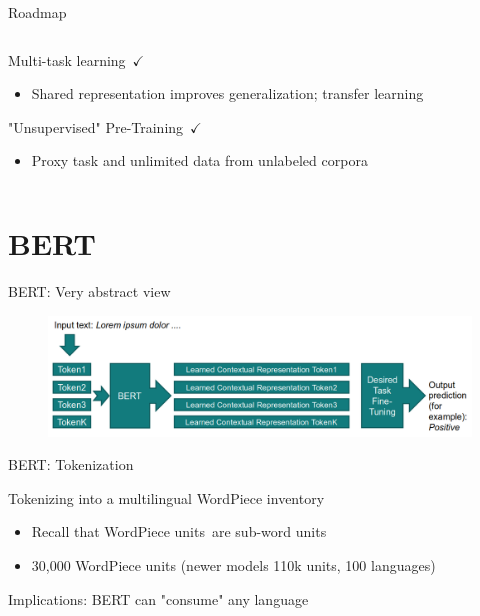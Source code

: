 \documentclass[12pt]{beamer}
\begin{document}
\begin{frame}{Roadmap}
\begin{columns}
\begin{column}{0.5\linewidth}
			
			Multi-task learning $\checkmark$
			
			\begin{itemize}
				\item {\scriptsize Shared representation improves generalization; transfer learning}
			\end{itemize}
			
			"Unsupervised" Pre-Training $\checkmark$
			
			\begin{itemize}
				\item {\scriptsize Proxy task and unlimited data from unlabeled corpora}
			\end{itemize}
			
		\end{column}
		
	\end{columns}
	
\end{frame}


\section{BERT}


\begin{frame}{BERT: Very abstract view}
	
\begin{figure}
	\includegraphics[width=\linewidth]{img/bert1.png}
\end{figure}	
	
\end{frame}


\begin{frame}{BERT: Tokenization}
	
Tokenizing into a multilingual WordPiece inventory

\begin{itemize}
	\item Recall that WordPiece units are sub-word units
	\item 30,000 WordPiece units (newer models 110k units, 100 languages)
\end{itemize}

Implications: BERT can "consume" any language

	
\end{frame}
\end{document}
